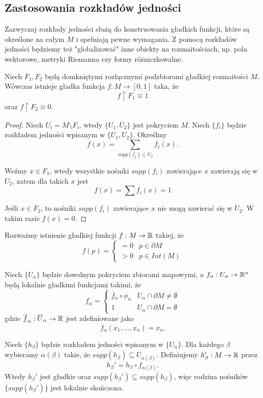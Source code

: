 \subsection{Zastosowania rozkładów jedności}

Zazwyczaj rozkłady jedności służą do konstruowania gładkich funkcji, które są określone na całym $M$ i spełniają pewne wymagania. Z pomocą rozkładów jedności będziemy też "globalizować" inne obiekty na rozmaitościach, np. pola wektorowe, metryki Riemanna czy formy różniczkowalne.

\begin{example}
\item Niech $F_1,F_2$ będą domkniętymi rozłącznymi podzbiorami gładkiej rozmaitości $M$. Wówczas istnieje gładka funkcja $f:M\to[0,1]$ taka, że 
  $$f\restriction F_1\equiv 1$$ 
  oraz $f\restriction F_2\equiv 0$.

  \begin{proof}
    Niech $U_i=M\setminus F_i$, wtedy $\{U_1,U_2\}$ jest pokryciem $M$. Niech $\{f_i\}$ będzie rozkładem jedności wpisanym w $\{U_1,U_2\}$. Określmy 
    $$f(x)=\sum_{supp(f_j)\subseteq U_2}f_j(x).$$

    Weźmy $x\in F_1$, wtedy wszystkie nośniki $supp(f_i)$ zawierające $x$ zawierają się w $U_2$, zatem dla takich $x$ jest
    $$f(x)=\sum f_i(x)=1$$

    Jeśli $x\in F_2$, to nośniki $supp(f_i)$ zawierające $x$ nie mogą zawierać się w $U_2$. W takim razie $f(x)=0$.
  \end{proof}
\item Rozważmy istnienie gładkiej funkcji $f:M\to\mathbb{R}$ takiej, że 
  $$f(p)=\begin{cases}=0&p\in\partial M\\>0&p\in Int(M)\end{cases}$$

  Niech $\{U_\alpha\}$ będzie dowolnym pokryciem zbiorami mapowymi, a $f_\alpha:U_\alpha\to\mathbb{R}^n$ będą lokalnie gładkimi funkcjami takimi, że
  $$f_\alpha=\begin{cases}\overline{f}_\alpha\circ\phi_\alpha&U_\alpha\cap\partial M\neq\emptyset\\1&U_\alpha\cap\partial M=\emptyset\end{cases}$$
  gdzie $\overline{f}_\alpha:\overline{U}_\alpha\to\mathbb{R}$ jest zdefiniowane jako
  $$\overline{f}_\alpha(x_1,...,x_n)=x_n.$$

  Niech $\{h_\beta\}$ będzie rozkładem jedności wpisanym w $\{U_\alpha\}$. Dla każdego $\beta$ wybieramy $\alpha(\beta)$ takie, że $supp(h_\beta)\subseteq U_{\alpha(\beta)}$. Definiujemy $h_\beta':M\to\mathbb{R}$ przez
  $$h_\beta'=h_\beta\circ f_{\alpha(\beta)}.$$
  Wtedy $h_\beta'$ jest gładkie oraz $supp(h_\beta')\subseteq supp(h_\beta)$, więc rodzina nośników $\{supp(h_\beta')\}$ jest lokalnie skończona.


\end{example}
